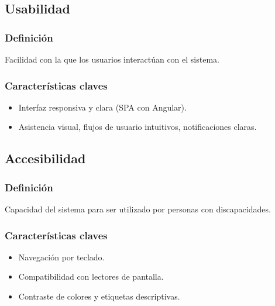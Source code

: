 	\subsection{Usabilidad}
		\subsubsection*{Definición}
			\noindent Facilidad con la que los usuarios interactúan con el sistema.
		
		\subsubsection*{Características claves}
			\begin{itemize}
				\item Interfaz responsiva y clara (SPA con Angular).
				\item Asistencia visual, flujos de usuario intuitivos, notificaciones claras.
			\end{itemize}
	
	\subsection{Accesibilidad}
		\subsubsection*{Definición}
			\noindent Capacidad del sistema para ser utilizado por personas con discapacidades.
		
		\subsubsection*{Características claves}
			\begin{itemize}
				\item Navegación por teclado.
				\item Compatibilidad con lectores de pantalla.
				\item Contraste de colores y etiquetas descriptivas.
			\end{itemize}
